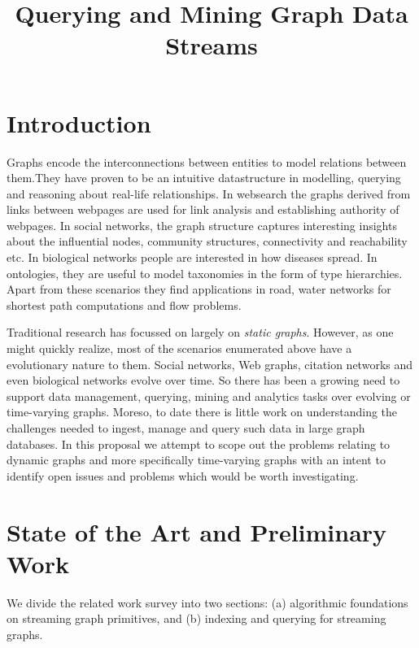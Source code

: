 \documentclass{scrartcl}
\begin{document}
  
 \title{Querying and Mining Graph Data Streams}
 \maketitle

\section{Introduction}

Graphs encode the interconnections between entities to model relations between them.They have proven to be an intuitive datastructure in modelling, querying and reasoning about real-life relationships. In websearch the graphs derived from links between webpages are used for link analysis and establishing authority of webpages. In social networks, the graph structure captures interesting insights about the influential nodes, community structures, connectivity and reachability etc. In biological networks people are interested in how diseases spread. In ontologies, they are useful to model taxonomies in the form of type hierarchies. Apart from these scenarios they find applications in road, water networks for shortest path computations and flow problems.

Traditional research has focussed on largely on \emph{static graphs}. However, as one might quickly realize, most of the scenarios enumerated above have a evolutionary nature to them. Social networks, Web graphs, citation networks and even biological networks evolve over time. So there has been a growing need to support data management, querying, mining and analytics tasks over evolving or time-varying graphs.  Moreso, to date there is little work on understanding the challenges needed to ingest, manage and query such data in large graph databases. In this proposal we attempt to scope out the problems relating to dynamic graphs and more specifically time-varying graphs with an intent to identify open issues and problems which would be worth investigating.


\section{State of the Art and Preliminary Work}

We divide the related work survey into two sections: (a) algorithmic foundations on streaming graph primitives, and (b) indexing and querying for streaming graphs.
\end{document}
